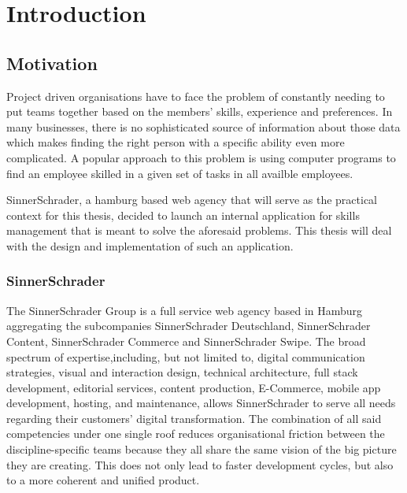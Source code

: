 \chapter{Introduction}

\section{Motivation}
Project driven organisations have to face the problem of constantly needing to put teams together based on the members’ skills, experience and preferences.
In many businesses, there is no sophisticated source of information about those data which makes finding the right person with a specific ability even more complicated. A popular approach to this problem is using computer programs to find an employee skilled in a given set of tasks in all availble employees.

SinnerSchrader, a hamburg based web agency that will serve as the practical context for this thesis, decided to launch an internal application for skills management that is meant to solve the aforesaid problems. This thesis will deal with the design and implementation of such an application.



\subsection{SinnerSchrader}

The SinnerSchrader Group is a full service web agency based in Hamburg aggregating the subcompanies SinnerSchrader Deutschland, SinnerSchrader Content, SinnerSchrader Commerce and SinnerSchrader Swipe. The broad spectrum of expertise,including, but not limited to, digital communication strategies, visual and interaction design,  technical architecture, full stack development, editorial services, content production, E-Commerce, mobile app development, hosting, and maintenance, allows SinnerSchrader to serve all needs regarding their customers' digital transformation. The combination of all said competencies under one single roof reduces organisational friction between the discipline-specific teams because they all share the same vision of the big picture they are creating. This does not only lead to faster development cycles, but also to a more coherent and unified product.

